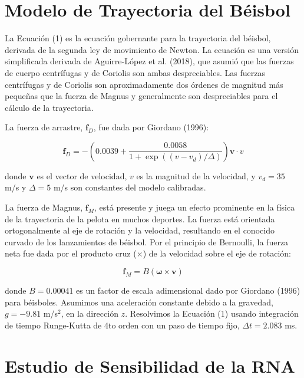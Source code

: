 \documentclass[12pt,a4paper]{article}
\begin{document}
\appendix

\section{Modelo de Trayectoria del Béisbol}

La Ecuación (1) es la ecuación gobernante para la trayectoria del béisbol, derivada de la segunda ley de movimiento de Newton. La ecuación es una versión simplificada derivada de Aguirre-López et al. (2018), que asumió que las fuerzas de cuerpo centrífugas y de Coriolis son ambas despreciables. Las fuerzas centrífugas y de Coriolis son aproximadamente dos órdenes de magnitud más pequeñas que la fuerza de Magnus y generalmente son despreciables para el cálculo de la trayectoria.

La fuerza de arrastre, $\mathbf{f}_D$, fue dada por Giordano (1996):

\begin{equation}
\mathbf{f}_D = -\left(0.0039 + \frac{0.0058}{1 + \exp((v - v_d)/\Delta)}\right)\mathbf{v} \cdot v
\end{equation}

donde $\mathbf{v}$ es el vector de velocidad, $v$ es la magnitud de la velocidad, y $v_d = 35$ m/s y $\Delta = 5$ m/s son constantes del modelo calibradas.

La fuerza de Magnus, $\mathbf{f}_M$, está presente y juega un efecto prominente en la física de la trayectoria de la pelota en muchos deportes. La fuerza está orientada ortogonalmente al eje de rotación y la velocidad, resultando en el conocido curvado de los lanzamientos de béisbol. Por el principio de Bernoulli, la fuerza neta fue dada por el producto cruz ($\times$) de la velocidad sobre el eje de rotación:

\begin{equation}
\mathbf{f}_M = B(\boldsymbol{\omega} \times \mathbf{v})
\end{equation}

donde $B = 0.00041$ es un factor de escala adimensional dado por Giordano (1996) para béisboles. Asumimos una aceleración constante debido a la gravedad, $g = -9.81$ m/s$^2$, en la dirección $z$. Resolvimos la Ecuación (1) usando integración de tiempo Runge-Kutta de 4to orden con un paso de tiempo fijo, $\Delta t = 2.083$ ms.

\section{Estudio de Sensibilidad de la RNA}
\end{document}
